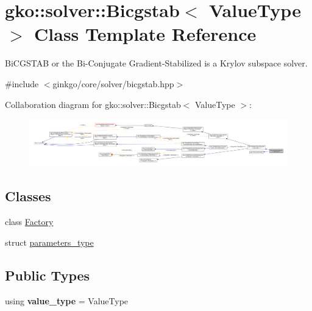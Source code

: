 \hypertarget{classgko_1_1solver_1_1Bicgstab}{}\section{gko\+:\+:solver\+:\+:Bicgstab$<$ Value\+Type $>$ Class Template Reference}
\label{classgko_1_1solver_1_1Bicgstab}


Bi\+C\+G\+S\+T\+AB or the Bi-\/\+Conjugate Gradient-\/\+Stabilized is a Krylov subspace solver.  




{\ttfamily \#include $<$ginkgo/core/solver/bicgstab.\+hpp$>$}



Collaboration diagram for gko\+:\+:solver\+:\+:Bicgstab$<$ Value\+Type $>$\+:
\nopagebreak
\begin{figure}[H]
\begin{center}
\leavevmode
\includegraphics[width=350pt]{classgko_1_1solver_1_1Bicgstab__coll__graph}
\end{center}
\end{figure}
\subsection*{Classes}
\begin{DoxyCompactItemize}
\item 
class \hyperlink{classgko_1_1solver_1_1Bicgstab_1_1Factory}{Factory}
\item 
struct \hyperlink{structgko_1_1solver_1_1Bicgstab_1_1parameters__type}{parameters\+\_\+type}
\end{DoxyCompactItemize}
\subsection*{Public Types}
\begin{DoxyCompactItemize}
\item 
\mbox{\label{classgko_1_1solver_1_1Bicgstab_ab670b7a800a5b86f4733adfe314a67a7}} 
using {\bfseries value\+\_\+type} = Value\+Type
\end{DoxyCompactItemize}
